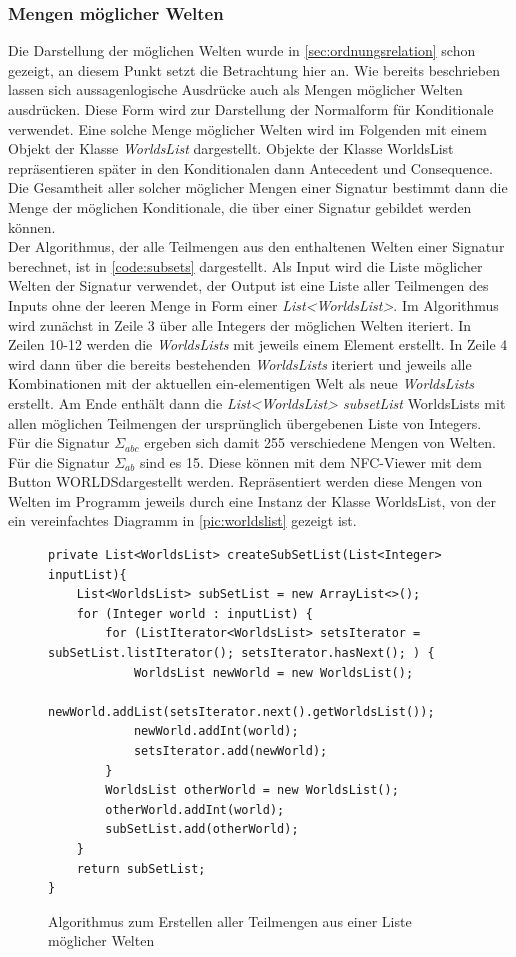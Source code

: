 \documentclass[12pt,a4paper]{article}
\begin{document}
\subsubsection{Mengen möglicher Welten}
Die Darstellung der möglichen Welten wurde in \autoref{sec:ordnungsrelation} schon gezeigt, an diesem Punkt setzt die Betrachtung hier an. Wie bereits beschrieben lassen sich aussagenlogische Ausdrücke auch als Mengen möglicher Welten ausdrücken. Diese Form wird zur Darstellung der Normalform für Konditionale verwendet. Eine solche Menge möglicher Welten wird im Folgenden mit einem Objekt der Klasse \textit{WorldsList} dargestellt. Objekte der Klasse WorldsList repräsentieren später in den Konditionalen dann Antecedent und Consequence. Die Gesamtheit aller solcher möglicher Mengen einer Signatur bestimmt dann die Menge der möglichen Konditionale, die über einer Signatur gebildet werden können. \\
Der Algorithmus, der alle Teilmengen aus den enthaltenen Welten einer Signatur berechnet, ist in \autoref{code:subsets} dargestellt. Als Input wird die Liste möglicher Welten der Signatur verwendet, der Output ist eine Liste aller Teilmengen des Inputs ohne der leeren Menge in Form einer \textit{List<WorldsList>}. Im Algorithmus wird zunächst in Zeile 3 über alle Integers der möglichen Welten iteriert. In Zeilen 10-12 werden die \textit{WorldsLists} mit jeweils einem Element erstellt. In Zeile 4 wird dann über die bereits bestehenden \textit{WorldsLists} iteriert und jeweils alle Kombinationen mit der aktuellen ein-elementigen Welt als neue \textit{WorldsLists} erstellt. Am Ende enthält dann die \textit{List<WorldsList> subsetList} WorldsLists mit allen möglichen Teilmengen der ursprünglich übergebenen Liste von Integers. \\
Für die Signatur $\Sigma_{abc}$ ergeben sich damit 255 verschiedene Mengen von Welten. Für die Signatur $\Sigma_{ab}$ sind es 15. Diese können mit dem NFC-Viewer mit dem Button \glqq WORLDS\grqq \space dargestellt werden. Repräsentiert werden diese Mengen von Welten im Programm jeweils durch eine Instanz der Klasse WorldsList, von der ein vereinfachtes Diagramm in \autoref{pic:worldslist} gezeigt ist. 




\begin{figure}
\begin{lstlisting}
private List<WorldsList> createSubSetList(List<Integer> inputList){
    List<WorldsList> subSetList = new ArrayList<>();
    for (Integer world : inputList) {
        for (ListIterator<WorldsList> setsIterator = subSetList.listIterator(); setsIterator.hasNext(); ) {
            WorldsList newWorld = new WorldsList();
            newWorld.addList(setsIterator.next().getWorldsList());
            newWorld.addInt(world);
            setsIterator.add(newWorld);
        }
        WorldsList otherWorld = new WorldsList();
        otherWorld.addInt(world);
        subSetList.add(otherWorld);
    }
    return subSetList;
}
\end{lstlisting}
\caption{Algorithmus zum Erstellen aller Teilmengen aus einer Liste möglicher Welten}
\label{code:subsets}
\end{figure}
\end{document}
